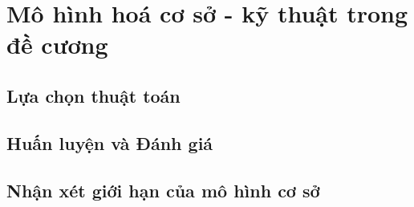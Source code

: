 \clearpage
\section{Mô hình hoá cơ sở - kỹ thuật trong đề cương}
\subsection{Lựa chọn thuật toán}

\subsection{Huấn luyện và Đánh giá}

\subsection{Nhận xét giới hạn của mô hình cơ sở}